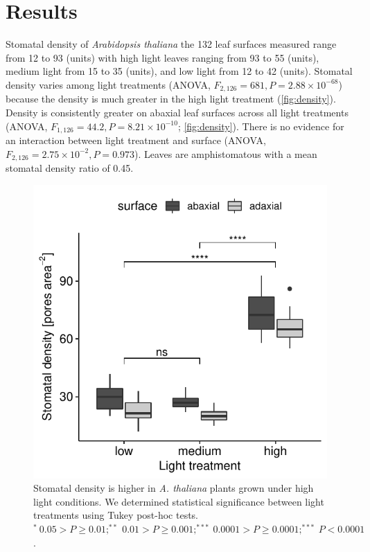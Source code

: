 \documentclass[12pt,halfline,a4paper,]{ouparticle}
\begin{document}
\hypertarget{results}{%
\section{Results}\label{results}}

Stomatal density of \emph{Arabidopsis thaliana} the 132 leaf surfaces
measured range from 12 to 93 (units) with high light leaves ranging from
93 to 55 (units), medium light from 15 to 35 (units), and low light from
12 to 42 (units). Stomatal density varies among light treatments (ANOVA,
\(F_{2,126} = 681, P = 2.88 \times 10^{-68}\)) because the density is
much greater in the high light treatment (\autoref{fig:density}).
Density is consistently greater on abaxial leaf surfaces across all
light treatments (ANOVA, \(F_{1,126} = 44.2, P = 8.21 \times 10^{-10}\);
\autoref{fig:density}). There is no evidence for an interaction between
light treatment and surface (ANOVA,
\(F_{2,126} = 2.75 \times 10^{-2}, P = 0.973\)). Leaves are
amphistomatous with a mean stomatal density ratio of 0.45.

\begin{figure}[ht]
\includegraphics[width = \textwidth]{figures/density.pdf}
\caption{Stomatal density is higher in \textit{A. thaliana} plants grown under high light conditions. We determined statistical significance between light treatments using Tukey post-hoc tests. $^*~0.05 > P \ge 0.01; ^{**}~0.01 > P \ge 0.001; ^{***}~0.0001 > P \ge 0.0001; ^{***}~ P <0.0001$.}
\label{fig:density}
\end{figure}
\end{document}

